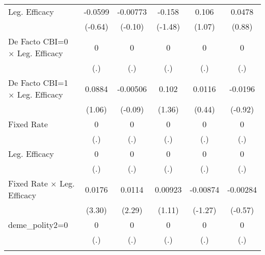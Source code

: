 \begin{table}[htbp]
\begin{tabular}{l*{5}{c}}
\addlinespace
Leg. Efficacy                           &  -0.0599         & -0.00773         &   -0.158         &    0.106         &   0.0478         \\
                                        &  (-0.64)         &  (-0.10)         &  (-1.48)         &   (1.07)         &   (0.88)         \\
\addlinespace
De Facto CBI=0 $\times$ Leg. Efficacy   &        0         &        0         &        0         &        0         &        0         \\
                                        &      (.)         &      (.)         &      (.)         &      (.)         &      (.)         \\
\addlinespace
De Facto CBI=1 $\times$ Leg. Efficacy   &   0.0884         & -0.00506         &    0.102         &   0.0116         &  -0.0196         \\
                                        &   (1.06)         &  (-0.09)         &   (1.36)         &   (0.44)         &  (-0.92)         \\
\addlinespace
Fixed Rate                              &        0         &        0         &        0         &        0         &        0         \\
                                        &      (.)         &      (.)         &      (.)         &      (.)         &      (.)         \\
\addlinespace
Leg. Efficacy                           &        0         &        0         &        0         &        0         &        0         \\
                                        &      (.)         &      (.)         &      (.)         &      (.)         &      (.)         \\
\addlinespace
Fixed Rate $\times$ Leg. Efficacy       &   0.0176\sym{**} &   0.0114\sym{*}  &  0.00923         & -0.00874         & -0.00284         \\
                                        &   (3.30)         &   (2.29)         &   (1.11)         &  (-1.27)         &  (-0.57)         \\
\addlinespace
deme\_polity2=0                          &        0         &        0         &        0         &        0         &        0         \\
                                        &      (.)         &      (.)         &      (.)         &      (.)         &      (.)         \\
\addlinespace

\end{tabular}
\end{table}
